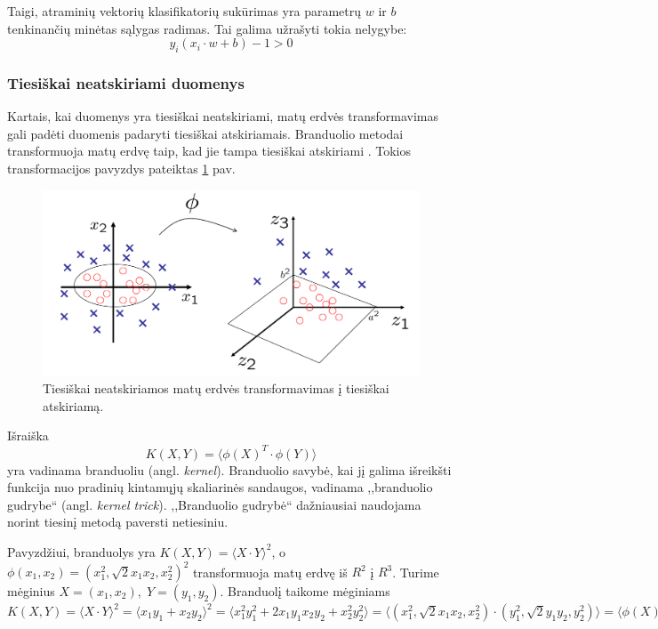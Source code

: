 Taigi, atraminių vektorių klasifikatorių sukūrimas yra parametrų $w$ ir $b$ tenkinančių minėtas sąlygas radimas. Tai galima užrašyti tokia nelygybe:
\begin{equation}
 \label{svm_separable}
 y_i(x_i \cdot w + b) - 1 > 0
\end{equation}

\subsubsection{Tiesiškai neatskiriami duomenys}

Kartais, kai duomenys yra tiesiškai neatskiriami, matų erdvės transformavimas gali padėti duomenis padaryti tiesiškai atskiriamais. Branduolio metodai transformuoja matų erdvę taip, kad jie tampa tiesiškai atskiriami \cite{aizerman1964theoretical}. Tokios transformacijos pavyzdys pateiktas \ref{fig:matu_erdves_transformavimas} pav.
\begin{figure}
 \centering
 \includegraphics[width=.7\textwidth]{images/matu_erdves_transformavimas.png}
 \caption{Tiesiškai neatskiriamos matų erdvės transformavimas į tiesiškai atskiriamą.}
 \label{fig:matu_erdves_transformavimas}
\end{figure}

Išraiška
\begin{equation}
 \label{kernel}
 K(X, Y) = \langle \phi(X)^T \cdot \phi(Y) \rangle
\end{equation}
yra vadinama branduoliu (angl. \textit{kernel}). Branduolio savybė, kai jį galima išreikšti funkcija nuo pradinių kintamųjų skaliarinės sandaugos, vadinama ,,branduolio gudrybe`` (angl. \textit{kernel trick}). ,,Branduolio gudrybė`` dažniausiai naudojama norint tiesinį metodą paversti netiesiniu. 

Pavyzdžiui, branduolys yra $K(X, Y)=\langle X \cdot Y \rangle ^ 2$, o $\phi(x_1, x_2)=(x_1^2, \sqrt{2}x_1x_2, x_2^2)^2$ transformuoja matų erdvę iš $R^2$ į $R^3$. Turime mėginius $X=(x_1, x_2),\; Y=(y_1, y_2)$. Branduolį taikome mėginiams $K(X, Y) = \langle X \cdot Y \rangle ^ 2 = \langle x_1y_1 + x_2y_2\rangle ^ 2 = \langle x_1^2y_1^2 + 2x_1y_1x_2y_2 + x_2^2y_2^2 \rangle = \langle (x_1^2, \sqrt{2}x_1x_2, x_2^2) \cdot (y_1^2, \sqrt{2}y_1y_2, y_2^2) \rangle = \langle \phi(X) \cdot \phi(Y) \rangle ^ 2$

